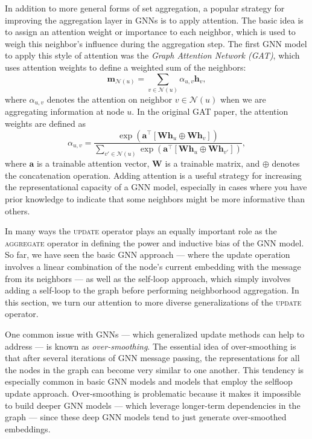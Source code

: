 \documentclass[10pt]{book}
\let\defaultmarginpar\marginpar
\renewcommand\marginpar[2][]{\defaultmarginpar{\itshape\color{gray}#2}}
\begin{document}
In addition to more general forms of set aggregation, a popular strategy for improving the aggregation layer in GNNs is to apply attention. The basic idea is to assign an attention weight or importance to each neighbor, which is used to weigh this neighbor’s influence during the aggregation step. The first GNN model to apply this style of attention was the \emph{Graph Attention Network (GAT)}\marginpar{Graph Attention Network (GAT)}, which uses attention weights to define a weighted sum of the neighbors:
\begin{equation}
    \mathbf m_{\mathcal N(u)} = \sum_{v \in \mathcal N(u)} \alpha_{u,v} \mathbf h_v,
\end{equation}
where $\alpha_{u,v}$ denotes the attention on neighbor $v \in \mathcal N(u)$ when we are aggregating information at node $u$. In the original GAT paper, the attention weights are defined as
\begin{equation}
    \alpha_{u,v} = \frac{\exp \left(\mathbf a^\top[\mathbf{Wh}_u \oplus \mathbf{Wh}_v] \right)}{\sum_{v' \in \mathcal N(u)} \exp \left( \mathbf a^\top [\mathbf{Wh}_u \oplus \mathbf{Wh}_{v'}] \right)},
\end{equation}
where $\mathbf a$ is a trainable attention vector, $\mathbf W$ is a trainable matrix, and $\oplus$ denotes the concatenation operation. Adding attention is a useful strategy for increasing the representational capacity of a GNN model, especially in cases where you have prior knowledge to indicate that some neighbors might be more informative than others. 

In many ways the \textsc{update} operator plays an equally important role as the \textsc{aggregate} operator in defining the power and inductive bias of the GNN model. So far, we have seen the basic GNN approach --- where the update operation involves a linear combination of the node’s current embedding with the message from its neighbors --- as well as the self-loop approach, which simply involves adding a self-loop to the graph before performing neighborhood aggregation. In this section, we turn our attention to more diverse generalizations of the \textsc{update} operator.

One common issue with GNNs --- which generalized update methods can help to address --- is known as \emph{over-smoothing}\marginpar{over-smoothing}. The essential idea of over-smoothing is that after several iterations of GNN message passing, the representations for all the nodes in the graph can become very similar to one another. This tendency is especially common in basic GNN models and models that employ the selfloop update approach. Over-smoothing is problematic because it makes it impossible to build deeper GNN models --- which leverage longer-term dependencies in the graph --- since these deep GNN models tend to just generate over-smoothed embeddings.
\end{document}
